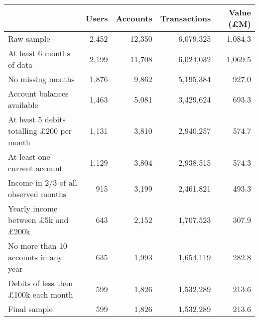 \begin{tabular}{lrrrr}
\toprule
                                                 & Users & Accounts & Transactions & Value (\pounds M) \\
\midrule
                                      Raw sample & 2,452 &   12,350 &    6,079,325 &           1,084.3 \\
                       At least 6 months of data & 2,199 &   11,708 &    6,024,032 &           1,069.5 \\
                               No missing months & 1,876 &    9,862 &    5,195,384 &             927.0 \\
                      Account balances available & 1,463 &    5,081 &    3,429,624 &             693.3 \\
At least 5 debits totalling \pounds200 per month & 1,131 &    3,810 &    2,940,257 &             574.7 \\
                    At least one current account & 1,129 &    3,804 &    2,938,515 &             574.3 \\
            Income in 2/3 of all observed months &   915 &    3,199 &    2,461,821 &             493.3 \\
 Yearly income between \pounds5k and \pounds200k &   643 &    2,152 &    1,707,523 &             307.9 \\
            No more than 10 accounts in any year &   635 &    1,993 &    1,654,119 &             282.8 \\
      Debits of less than \pounds100k each month &   599 &    1,826 &    1,532,289 &             213.6 \\
                                    Final sample &   599 &    1,826 &    1,532,289 &             213.6 \\
\bottomrule
\end{tabular}

